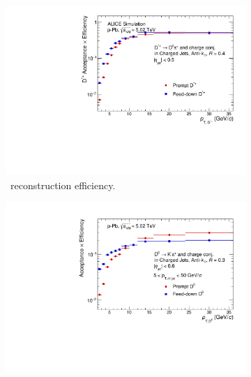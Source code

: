 %
%
\begin{figure}[bth]
\centering
\begin{subfigure}[c]{0.45\textwidth}
\includegraphics[width=\textwidth,height=0.8\textwidth]{pPbplots/DjetEff_Sim_log}
\caption{\Dstar\  reconstruction efficiency.}
\label{eq_pPb_DrecEff}
\end{subfigure}
\begin{subfigure}[d]{0.45\textwidth}
\includegraphics[width=\textwidth,height=0.85\textwidth]{pPbplotsD0/Default/efficiency/DjetEff_Sim_log.pdf}

\end{subfigure}
\end{figure}
